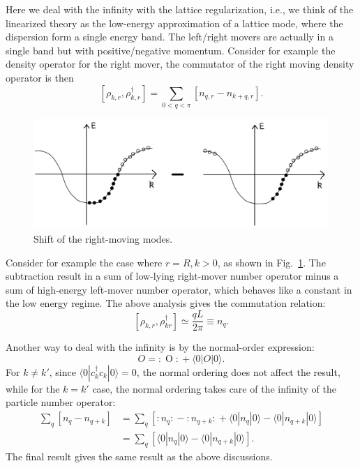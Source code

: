 Here we deal with the infinity with the lattice regularization, i.e., we think of the linearized theory as the low-energy approximation of a lattice mode, where the dispersion form a single energy band.
The left/right movers are actually in a single band but with positive/negative momentum.
Consider for example the density operator for the right mover, the commutator of the right moving density operator is then
\begin{equation}
	\left[\rho_{k,r}, \rho_{k,r}^\dagger \right] = \sum_{0<q<\pi} [n_{q,r}-n_{k+q,r}].
\end{equation}

\begin{figure}
	\centering
	\includegraphics[width=0.5\linewidth]{pics/LL-k-shift}
	\caption{Shift of the right-moving modes.}
	\label{fig:bs-k-shift}
\end{figure}

Consider for example the case where $r=R,k>0$, as shown in Fig.~\ref{fig:bs-k-shift}.
The subtraction result in a sum of low-lying right-mover number operator minus a sum of high-energy left-mover number operator, which behaves like a constant in the low energy regime. 
The above analysis gives the commutation relation:
\begin{equation}
	\left[\rho_{k,r}, \rho_{kr}^\dagger \right] \simeq \frac{qL}{2\pi} \equiv n_q.
\end{equation}

Another way to deal with the infinity is by the normal-order expression:
\begin{equation}
	O = {:\mathrel{O}:} + \langle 0|O|0\rangle.
\end{equation}
For $k\ne k'$, since $\langle 0|c_k^\dagger c_k|0\rangle=0$, the normal ordering does not affect the result, while for the $k=k'$ case, the normal ordering takes care of the infinity of the particle number operator:
\begin{equation}
\begin{aligned}
	\sum_q [n_{q} - n_{q+k}]
	&= \sum_q \left[{:\mathrel{n_{q}}:} - {:\mathrel{n_{q+k}}:} 
		+ \langle0|n_{q}|0\rangle -\langle0|n_{q+k}|0\rangle \right] \\
	&= \sum_q [\langle0|n_{q}|0\rangle -\langle0|n_{q+k}|0\rangle].
\end{aligned}
\end{equation}
The final result gives the same result as the above discussions.

